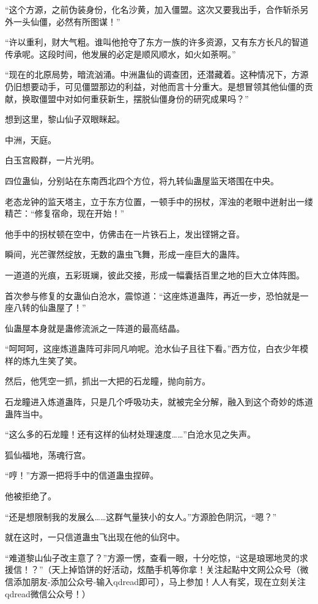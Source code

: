 \begin{this_body}
“这个方源，之前伪装身份，化名沙黄，加入僵盟。这次又要我出手，合作斩杀另外一头仙僵，必然有所图谋！”

“许以重利，财大气粗。谁叫他抢夺了东方一族的许多资源，又有东方长凡的智道传承呢。这段时间，他发展的必定是顺风顺水，如火如荼啊。”

“现在的北原局势，暗流汹涌。中洲蛊仙的调查团，还潜藏着。这种情况下，方源仍旧想要动手，可见僵盟那边的利益，对他而言十分重大。是想冒领其他仙僵的贡献，换取僵盟中对如何重获新生，摆脱仙僵身份的研究成果吗？”

想到这里，黎山仙子双眼眯起。

中洲，天庭。

白玉宫殿群，一片光明。

四位蛊仙，分别站在东南西北四个方位，将九转仙蛊屋监天塔围在中央。

老态龙钟的监天塔主，立于东方位置，一顿手中的拐杖，浑浊的老眼中迸射出一缕精芒：“修复宿命，现在开始！”

他手中的拐杖顿在空中，仿佛击在一片铁石上，发出铿锵之音。

瞬间，光芒骤然绽放，无数的蛊虫飞舞，形成一座巨大的蛊阵。

一道道的光痕，五彩斑斓，彼此交接，形成一幅囊括百里之地的巨大立体阵图。

首次参与修复的女蛊仙白沧水，震惊道：“这座炼道蛊阵，再近一步，恐怕就是一座八转的仙蛊屋了！”

仙蛊屋本身就是蛊修流派之一阵道的最高结晶。

“呵呵呵，这座炼道蛊阵可非同凡响呢。沧水仙子且往下看。”西方位，白衣少年模样的炼九生笑了笑。

然后，他凭空一抓，抓出一大把的石龙瞳，抛向前方。

石龙瞳进入炼道蛊阵，只是几个呼吸功夫，就被完全分解，融入到这个奇妙的炼道蛊阵当中。

“这么多的石龙瞳！还有这样的仙材处理速度……”白沧水见之失声。

狐仙福地，荡魂行宫。

“哼！”方源一把将手中的信道蛊虫捏碎。

他被拒绝了。

“还是想限制我的发展么……这群气量狭小的女人。”方源脸色阴沉，“嗯？”

就在这时，一只信道蛊虫飞出现在他的仙窍中。

“难道黎山仙子改主意了？”方源一愣，查看一眼，十分吃惊，“这是琅琊地灵的求援信！？”（天上掉馅饼的好活动，炫酷手机等你拿！关注起點中文网公众号（微信添加朋友-添加公众号-输入qdread即可），马上参加！人人有奖，现在立刻关注qdread微信公众号！）

\end{this_body}

